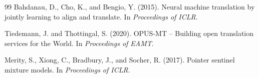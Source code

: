 \documentclass[12pt,a4paper]{article}
\begin{document}
\begin{thebibliography}{99}
Bahdanau, D., Cho, K., and Bengio, Y. (2015).
\newblock Neural machine translation by jointly learning to align and translate.
\newblock In \textit{Proceedings of ICLR}.

Tiedemann, J. and Thottingal, S. (2020).
\newblock OPUS-MT -- Building open translation services for the World.
\newblock In \textit{Proceedings of EAMT}.

Merity, S., Xiong, C., Bradbury, J., and Socher, R. (2017).
\newblock Pointer sentinel mixture models.
\newblock In \textit{Proceedings of ICLR}.

\end{thebibliography}
\end{document}
